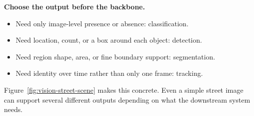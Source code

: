 \begin{decisionbox}
\textbf{Choose the output before the backbone.}
\begin{itemize}[leftmargin=*]
\item Need only image-level presence or absence: classification.
\item Need location, count, or a box around each object: detection.
\item Need region shape, area, or fine boundary support: segmentation.
\item Need identity over time rather than only one frame: tracking.
\end{itemize}
\end{decisionbox}

Figure~\ref{fig:vision-street-scene} makes this concrete. Even a simple street image can support several different outputs depending on what the downstream system needs.

